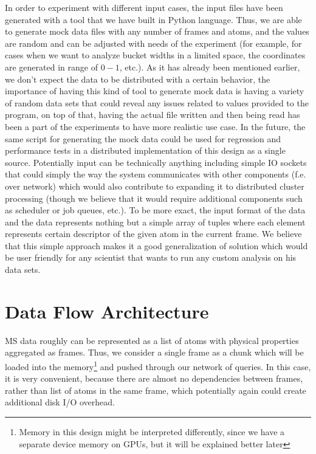 \documentclass[12pt,letterpaper]{report}
\begin{document}
\noindent\hspace{3em}In order to experiment with different input cases, the input files have been generated with a tool that we have built in Python language. Thus, we are able to generate mock data files with any number of frames and atoms, and the values are random and can be adjusted with needs of the experiment (for example, for cases when we want to analyze bucket widths in a limited space, the coordinates are generated in range of $0 - 1$, etc.). As it has already been mentioned earlier, we don't expect the data to be distributed with a certain behavior, the importance of having this kind of tool to generate mock data is having a variety of random data sets that could reveal any issues related to values provided to the program, on top of that, having the actual file written and then being read has been a part of the experiments to have more realistic use case. In the future, the same script for generating the mock data could be used for regression and performance tests in a distributed implementation of this design as a single source. Potentially input can be technically anything including simple IO sockets that could simply the way the system communicates with other components (f.e. over network) which would also contribute to expanding it to distributed cluster processing (though we believe that it would require additional components such as scheduler or job queues, etc.). To be more exact, the input format of the data and the data represents nothing but a simple array of tuples where each element represents certain descriptor of the given atom in the current frame. We believe that this simple approach makes it a good generalization of solution which would be user friendly for any scientist that wants to run any custom analysis on his data sets.

\section{Data Flow Architecture}

\hspace{3em} MS data roughly can be represented as a list of atoms with physical properties aggregated as frames. Thus, we consider a single frame as a chunk which will be loaded into the memory\footnote{Memory in this design might be interpreted differently, since we have a separate device memory on GPUs, but it will be explained better later} and pushed through our network of queries. In this case, it is very convenient, because there are almost no dependencies between frames, rather than list of atoms in the same frame, which potentially again could create additional disk I/O overhead.
\end{document}
